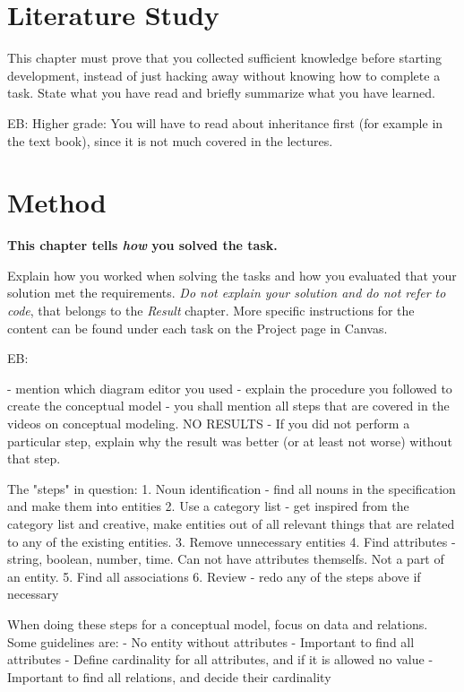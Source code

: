 \documentclass[a4paper]{scrartcl}
\begin{document}
\section{Literature Study}

This chapter must prove that you collected sufficient knowledge before starting development, instead of just hacking away without knowing how to complete a task. State what you have read and briefly summarize what you have learned.

EB:
Higher grade:
You will have to read about inheritance first (for example in the text book), since it is not much covered in the lectures. 

\section{Method}

\textbf{This chapter tells \textit{how} you solved the task.}

Explain how you worked when solving the tasks and how you evaluated that your solution met the requirements. \textit{Do not explain your solution and do not refer to code}, that belongs to the \textit{Result} chapter. More specific instructions for the content can be found under each task on the Project page in Canvas.

EB:

- mention which diagram editor you used
- explain the procedure you followed to create the conceptual model
- you shall mention all steps that are covered in the videos on conceptual modeling. NO RESULTS
- If you did not perform a particular step, explain why the result was better (or at least not worse) without that step. 

The "steps" in question: 
1. Noun identification - find all nouns in the specification and make them into entities
2. Use a category list - get inspired from the category list and creative, make entities out of all relevant things that are related to any of the existing entities.
3. Remove unnecessary entities
4. Find attributes - string, boolean, number, time. Can not have attributes themselfs. Not a part of an entity.
5. Find all associations 
6. Review - redo any of the steps above if necessary 

When doing these steps for a conceptual model, focus on data and relations. Some guidelines are: 
- No entity without attributes
- Important to find all attributes
- Define cardinality for  all attributes, and if it is allowed no value
- Important to find all relations, and decide their cardinality
\end{document}
